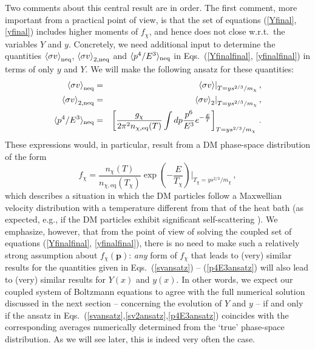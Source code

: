 \documentclass[twocolumn,showpacs,amsmath,amssymb,superscriptaddress,nofootinbib]{revtex4-1}
\newcommand{\be}{\begin{equation}}
\newcommand{\ee}{\end{equation}}
\newcommand{\bea}{\begin{eqnarray}}
\newcommand{\eea}{\end{eqnarray}}
\begin{document}
Two comments about this central result are in order. 
The first comment, more important from a practical point of view, is that the set of equations 
(\ref{Yfinal}, \ref{yfinal}) includes higher moments of $f_\chi$,
and hence does not close w.r.t.~the variables $Y$ and $y$. Concretely, we need additional input
to determine the quantities $\left\langle \sigma v\right\rangle_{{\rm neq}}$, 
$\left\langle \sigma v\right\rangle_{2,{\rm neq}}$ and $\langle p^4/E^3 \rangle_{\rm neq}$ in 
Eqs.~(\ref{Yfinalfinal}, \ref{yfinalfinal})
in terms of only $y$ and $Y$. 
We will make the following ansatz for these quantities:
\bea
  \left\langle \sigma v\right\rangle_{{\rm neq}} &=&  \left.\left\langle \sigma v\right\rangle\right|_{T=y s^{2/3}/m_\chi}, 
  \label{svansatz}\\
\left\langle \sigma v\right\rangle_{2,{\rm neq}} &=& \left.\left\langle \sigma v\right\rangle_{2}\right|_{T=y s^{2/3}/m_\chi},
\label{sv2ansatz}\\
\langle p^4/E^3 \rangle_{\rm neq} &=&
\left[\frac{g_\chi}{2\pi^2 n_{\chi,\text{eq}}(T)}\int dp\frac{p^6}{E^3} e^{-\frac{E}{T}}\right]_{T=y s^{2/3}/m_\chi}
\label{p4E3ansatz}\,.
\eea
These expressions would, in particular, result from a DM phase-space distribution of the form
\be
\label{MB_ansatz}
f_\chi = \frac{n_\chi(T)}{n_{\chi, \text{eq}}(T_{\chi})}\exp \left(-\frac{E}{T_\chi}\right) \bigg|_{T_\chi=y s^{2/3}/m_\chi}\,,
\ee
which describes a situation in which the DM particles follow a Maxwellian velocity distribution with 
a temperature different from that of the heat bath (as expected, e.g., if the DM particles exhibit significant 
self-scattering \cite{Feng:2009hw,Buckley:2009in,Feng:2010zp,vandenAarssen:2012ag}). We emphasize, 
however, that from the point of view of solving the coupled set 
of equations (\ref{Yfinalfinal}, \ref{yfinalfinal}), there is no need to make such a relatively strong
assumption about $f_\chi(\mathbf{p})$: {\it any} form of $f_\chi$ that leads to (very) similar results for the 
quantities given in Eqs.~(\ref{svansatz}) -- (\ref{p4E3ansatz}) will also lead to (very) similar results for
$Y(x)$ and $y(x)$. In other words, we expect our coupled system of Boltzmann equations to 
agree with the full numerical solution discussed in the next section
-- concerning the evolution of $Y$ and $y$ -- if and only if the ansatz in Eqs.~(\ref{svansatz},\ref{sv2ansatz},\ref{p4E3ansatz}) coincides with the 
corresponding averages numerically determined from the `true' phase-space distribution. 
As we will see later,  this is indeed very often the case.
\end{document}
